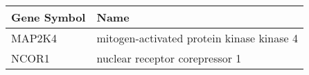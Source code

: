 \begin{tabular}{ll}
\toprule
Gene Symbol &                                      Name \\
\midrule
     MAP2K4 & mitogen-activated protein kinase kinase 4 \\
      NCOR1 &            nuclear receptor corepressor 1 \\
\bottomrule
\end{tabular}
